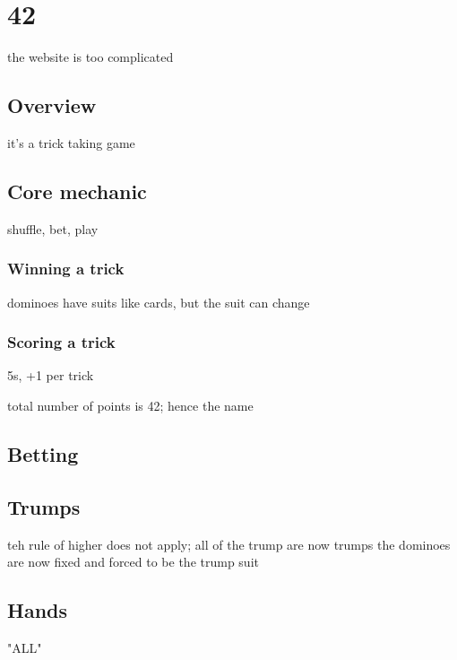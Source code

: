 \section{42}

the website is too complicated


\subsection{Overview}

it's a trick taking game

\subsection{Core mechanic}

shuffle, bet, play

\subsubsection{Winning a trick}

dominoes have suits like cards, but the suit can change

\subsubsection{Scoring a trick}

5s, +1 per trick

total number of points is 42; hence the name

\subsection{Betting}


\subsection{Trumps}

teh rule of higher does not apply; all of the trump are now trumps
the dominoes are now fixed and forced to be the trump suit

\subsection{Hands}

"ALL"
